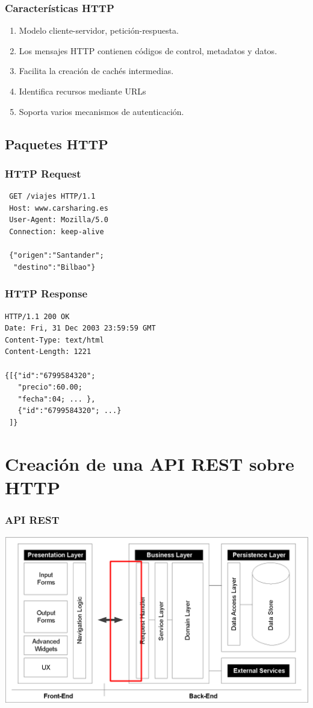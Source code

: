 \documentclass[a4paper,slidestop,xcolor=pst,blue]{beamer}
\begin{document}
\begin{frame}[c]
    \frametitle{Características HTTP}
    \begin{enumerate}[<+->]
        \item Modelo cliente-servidor, petición-respuesta.
        \item Los mensajes HTTP contienen códigos de control, metadatos y datos.
        \item Facilita la creación de cachés intermedias.
        \item Identifica recursos mediante URLs
        \item Soporta varios mecanismos de autenticación.
    \end{enumerate}
\end{frame}

\subsection{Paquetes HTTP}

\begin{frame}[c,fragile]
    \frametitle{HTTP Request}
\begin{verbatim}
 GET /viajes HTTP/1.1
 Host: www.carsharing.es
 User-Agent: Mozilla/5.0
 Connection: keep-alive

 {"origen":"Santander";
  "destino":"Bilbao"}
\end{verbatim}
\end{frame}

\begin{frame}[c,fragile]
    \frametitle{HTTP Response}
\begin{verbatim}
HTTP/1.1 200 OK
Date: Fri, 31 Dec 2003 23:59:59 GMT
Content-Type: text/html
Content-Length: 1221

{[{"id":"6799584320";
   "precio":60.00;
   "fecha":04; ... },
   {"id":"6799584320"; ...}
 ]}
\end{verbatim}
\end{frame}

\section{Creación de una API REST sobre HTTP}

\begin{frame}[c]
    \frametitle{API REST}
    \begin{center}
        \includegraphics[width=\linewidth]{images/apiRest/enterpriseArchitectures(api).eps}
    \end{center}
\end{frame}
\end{document}
